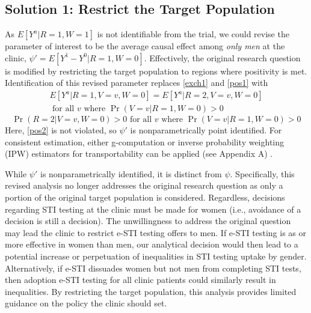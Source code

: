 \documentclass[]{article}
\begin{document}
\subsection*{Solution 1: Restrict the Target Population}

As $E[Y^a | R=1, W=1]$ is not identifiable from the trial, we could revise the parameter of interest to be the average causal effect among \textit{only men} at the clinic, $\psi' = E[Y^1 - Y^0 | R=1,W=0]$. Effectively, the original research question is modified by restricting the target population to regions where positivity is met. Identification of this revised parameter replaces \ref{exch1} and \ref{pos1} with
\begin{equation}
	\begin{aligned}
		E[Y^a | R=1,V=v,W=0] = E[Y^a | R=2,V=v,W=0]  \\
		\text{ for all } v \text{ where } \Pr(V=v | R=1,W=0) > 0
	\end{aligned}
	\label{exch2}
\end{equation}
\begin{equation}
	\Pr(R=2 | V=v, W=0) > 0 \text{ for all } v \text{ where } \Pr(V=v | R=1,W=0) > 0
	\label{pos2}
\end{equation}
Here, \ref{pos2} is not violated, so $\psi'$ is nonparametrically point identified. For consistent estimation, either g-computation or inverse probability weighting (IPW) estimators for transportability can be applied (see Appendix A) \cite{westreich_transportability_2017, dahabreh_extending_2020}.

While $\psi'$ is nonparametrically identified, it is distinct from $\psi$. Specifically, this revised analysis no longer addresses the original research question as only a portion of the original target population is considered. Regardless, decisions regarding STI testing at the clinic must be made for women (i.e., avoidance of a decision is still a decision). The unwillingness to address the original question may lead the clinic to restrict e-STI testing offers to men. If e-STI testing is as or more effective in women than men, our analytical decision would then lead to a potential increase or perpetuation of inequalities in STI testing uptake by gender. Alternatively, if e-STI dissuades women but not men from completing STI tests, then adoption e-STI testing for all clinic patients could similarly result in inequalities. By restricting the target population, this analysis provides limited guidance on the policy the clinic should set.
\end{document}
